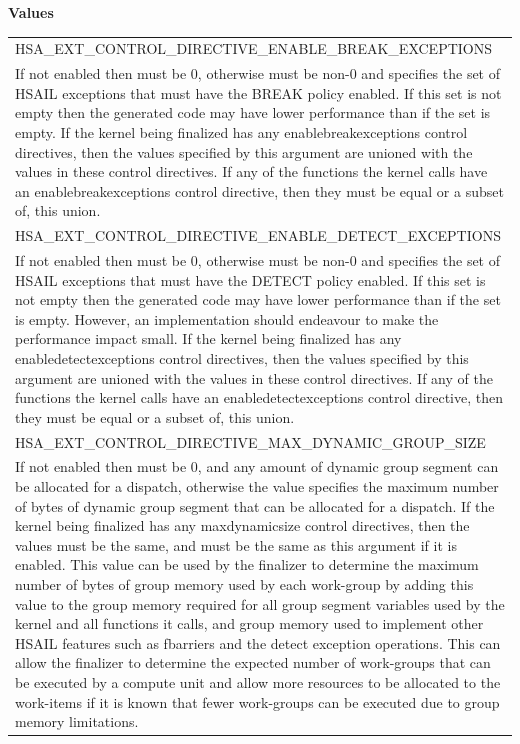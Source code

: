 \documentclass[final]{book}
\newcommand{\reftyp}[1]{#1}
\newcommand{\refenu}[1]{\reftyp{#1}}
\begin{document}
\noindent\textbf{Values}\\[-5mm]
\begin{longtable}{@{\hspace{2em}}p{\linewidth-2em}}
\hspace{-2em}\refenu{HSA_\-EXT_\-CONTROL_\-DIRECTIVE_\-ENABLE_\-BREAK_\-EXCEPTIONS}\\If not enabled then must be 0, otherwise must be non-0 and specifies the set of HSAIL exceptions that must have the BREAK policy enabled. If this set is not empty then the generated code may have lower performance than if the set is empty. If the kernel being finalized has any enablebreakexceptions control directives, then the values specified by this argument are unioned with the values in these control directives. If any of the functions the kernel calls have an enablebreakexceptions control directive, then they must be equal or a subset of, this union.\\[2mm]
\hspace{-2em}\refenu{HSA_\-EXT_\-CONTROL_\-DIRECTIVE_\-ENABLE_\-DETECT_\-EXCEPTIONS}\\If not enabled then must be 0, otherwise must be non-0 and specifies the set of HSAIL exceptions that must have the DETECT policy enabled. If this set is not empty then the generated code may have lower performance than if the set is empty. However, an implementation should endeavour to make the performance impact small. If the kernel being finalized has any enabledetectexceptions control directives, then the values specified by this argument are unioned with the values in these control directives. If any of the functions the kernel calls have an enabledetectexceptions control directive, then they must be equal or a subset of, this union.\\[2mm]
\hspace{-2em}\refenu{HSA_\-EXT_\-CONTROL_\-DIRECTIVE_\-MAX_\-DYNAMIC_\-GROUP_\-SIZE}\\If not enabled then must be 0, and any amount of dynamic group segment can be allocated for a dispatch, otherwise the value specifies the maximum number of bytes of dynamic group segment that can be allocated for a dispatch. If the kernel being finalized has any maxdynamicsize control directives, then the values must be the same, and must be the same as this argument if it is enabled. This value can be used by the finalizer to determine the maximum number of bytes of group memory used by each work-group by adding this value to the group memory required for all group segment variables used by the kernel and all functions it calls, and group memory used to implement other HSAIL features such as fbarriers and the detect exception operations. This can allow the finalizer to determine the expected number of work-groups that can be executed by a compute unit and allow more resources to be allocated to the work-items if it is known that fewer work-groups can be executed due to group memory limitations.\\[2mm]

\end{longtable}
\end{document}
